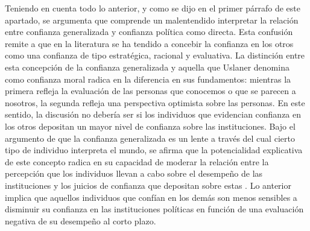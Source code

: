 \documentclass[12pt,twoside]{templates/facsothesis}
\begin{document}
Teniendo en cuenta todo lo anterior, y como se dijo en el primer párrafo de este apartado, se argumenta que comprende un malentendido interpretar la relación entre confianza generalizada y confianza política como directa. Esta confusión remite a que en la literatura se ha tendido a concebir la confianza en los otros como una confianza de tipo estratégica, racional y evaluativa. La distinción entre esta concepción de la confianza generalizada y aquella que Uslaner \citetext{\citeyear{uslanerMoralFoundationsTrust2002}; \citeyear{uslanerStudyTrust2017}} denomina como confianza moral radica en la diferencia en sus fundamentos: mientras la primera refleja la evaluación de las personas que conocemos o que se parecen a nosotros, la segunda refleja una perspectiva optimista sobre las personas. En este sentido, la discusión no debería ser si los individuos que evidencian confianza en los otros depositan un mayor nivel de confianza sobre las instituciones. Bajo el argumento de que la confianza generalizada es un lente a través del cual cierto tipo de individuo interpreta el mundo, se afirma que la potencialidad explicativa de este concepto radica en su capacidad de moderar la relación entre la percepción que los individuos llevan a cabo sobre el desempeño de las instituciones y los juicios de confianza que depositan sobre estas \citep{oskarssonGeneralizedTrustPolitical2010}. Lo anterior implica que aquellos individuos que confían en los demás son menos sensibles a disminuir su confianza en las instituciones políticas en función de una evaluación negativa de su desempeño al corto plazo.
\end{document}
